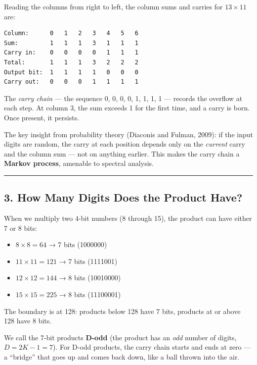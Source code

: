 \documentclass[
  11pt,
]{article}
\providecommand{\tightlist}{%
  \setlength{\itemsep}{0pt}\setlength{\parskip}{0pt}}
\begin{document}
Reading the columns from right to left, the column sums and carries for
\(13 \times 11\) are:

\begin{verbatim}
Column:      0   1   2   3   4   5   6
Sum:         1   1   1   3   1   1   1
Carry in:    0   0   0   0   1   1   1
Total:       1   1   1   3   2   2   2
Output bit:  1   1   1   1   0   0   0
Carry out:   0   0   0   1   1   1   1
\end{verbatim}

The \emph{carry chain} --- the sequence 0, 0, 0, 0, 1, 1, 1, 1 --- records the
overflow at each step. At column 3, the sum exceeds 1 for the first time, and a
carry is born. Once present, it persists.

The key insight from probability theory (Diaconis and Fulman, 2009): if the
input digits are random, the carry at each position depends only on the
\emph{current} carry and the column sum --- not on anything earlier. This makes
the carry chain a \textbf{Markov process}, amenable to spectral analysis.

\begin{center}\rule{0.5\linewidth}{0.5pt}\end{center}

\newpage

\subsection{3. How Many Digits Does the Product
Have?}\label{how-many-digits-does-the-product-have}

When we multiply two 4-bit numbers (8 through 15), the product can have either 7
or 8 bits:

\begin{itemize}
\tightlist
\item
  \(8 \times 8 = 64\) → 7 bits (1000000)
\item
  \(11 \times 11 = 121\) → 7 bits (1111001)
\item
  \(12 \times 12 = 144\) → 8 bits (10010000)
\item
  \(15 \times 15 = 225\) → 8 bits (11100001)
\end{itemize}

The boundary is at 128: products below 128 have 7 bits, products at or above 128
have 8 bits.

We call the 7-bit products \textbf{D-odd} (the product has an \emph{odd} number
of digits, \(D = 2K - 1 = 7\)). For D-odd products, the carry chain starts and
ends at zero --- a ``bridge'' that goes up and comes back down, like a ball
thrown into the air.
\end{document}
